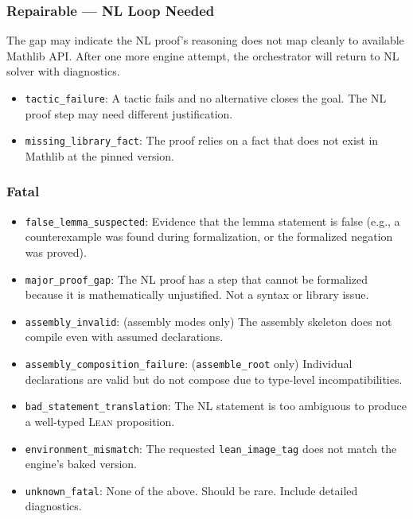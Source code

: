 \documentclass[11pt,a4paper]{article}
\newcommand{\Lean}{\textsc{Lean}}
\begin{document}
\subsubsection{Repairable --- NL Loop Needed}

The gap may indicate the NL proof's reasoning does not map cleanly to available Mathlib API. After one more engine attempt, the orchestrator will return to NL solver with diagnostics.

\begin{itemize}[leftmargin=2em]
  \item \texttt{tactic\_failure}: A tactic fails and no alternative closes the goal. The NL proof step may need different justification.
  \item \texttt{missing\_library\_fact}: The proof relies on a fact that does not exist in Mathlib at the pinned version.
\end{itemize}

\subsubsection{Fatal}

\begin{itemize}[leftmargin=2em]
  \item \texttt{false\_lemma\_suspected}: Evidence that the lemma statement is false (e.g., a counterexample was found during formalization, or the formalized negation was proved).
  \item \texttt{major\_proof\_gap}: The NL proof has a step that cannot be formalized because it is mathematically unjustified. Not a syntax or library issue.
  \item \texttt{assembly\_invalid}: (assembly modes only) The assembly skeleton does not compile even with assumed declarations.
  \item \texttt{assembly\_composition\_failure}: (\texttt{assemble\_root} only) Individual declarations are valid but do not compose due to type-level incompatibilities.
  \item \texttt{bad\_statement\_translation}: The NL statement is too ambiguous to produce a well-typed \Lean{} proposition.
  \item \texttt{environment\_mismatch}: The requested \texttt{lean\_image\_tag} does not match the engine's baked version.
  \item \texttt{unknown\_fatal}: None of the above. Should be rare. Include detailed diagnostics.
\end{itemize}
\end{document}
